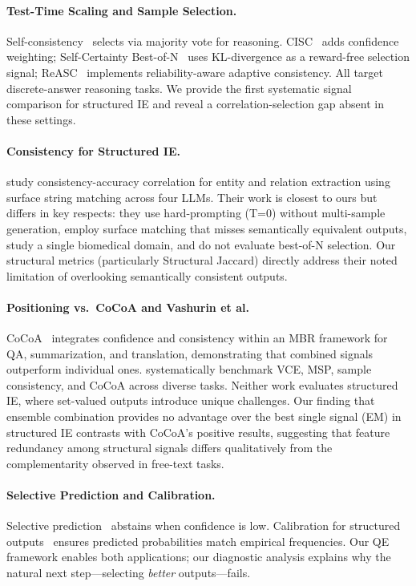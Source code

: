 \documentclass[11pt,a4paper]{article}
\begin{document}
\paragraph{Test-Time Scaling and Sample Selection.}
Self-consistency~\citep{wang2023selfconsistency} selects via majority vote for reasoning.
CISC~\citep{cisc2025} adds confidence weighting; Self-Certainty Best-of-N~\citep{selfcertainty2026} uses KL-divergence as a reward-free selection signal; ReASC~\citep{reasc2026} implements reliability-aware adaptive consistency.
All target discrete-answer reasoning tasks.
We provide the first systematic signal comparison for structured IE and reveal a correlation-selection gap absent in these settings.

\paragraph{Consistency for Structured IE.}
\citet{nédellec2026consistency} study consistency-accuracy correlation for entity and relation extraction using surface string matching across four LLMs.
Their work is closest to ours but differs in key respects: they use hard-prompting (T=0) without multi-sample generation, employ surface matching that misses semantically equivalent outputs, study a single biomedical domain, and do not evaluate best-of-N selection.
Our structural metrics (particularly Structural Jaccard) directly address their noted limitation of overlooking semantically consistent outputs.

\paragraph{Positioning vs.\ CoCoA and Vashurin et al.}
CoCoA~\citep{vashurin2025cocoa} integrates confidence and consistency within an MBR framework for QA, summarization, and translation, demonstrating that combined signals outperform individual ones.
\citet{vashurin2025benchmarking} systematically benchmark VCE, MSP, sample consistency, and CoCoA across diverse tasks.
Neither work evaluates structured IE, where set-valued outputs introduce unique challenges.
Our finding that ensemble combination provides no advantage over the best single signal (EM) in structured IE contrasts with CoCoA's positive results, suggesting that feature redundancy among structural signals differs qualitatively from the complementarity observed in free-text tasks.

\paragraph{Selective Prediction and Calibration.}
Selective prediction~\citep{geifman2017selective,kamath2020abstention} abstains when confidence is low.
Calibration for structured outputs~\citep{kuleshov2015calibration,jagannatha2022calibration} ensures predicted probabilities match empirical frequencies.
Our QE framework enables both applications; our diagnostic analysis explains why the natural next step---selecting \emph{better} outputs---fails.
\end{document}
